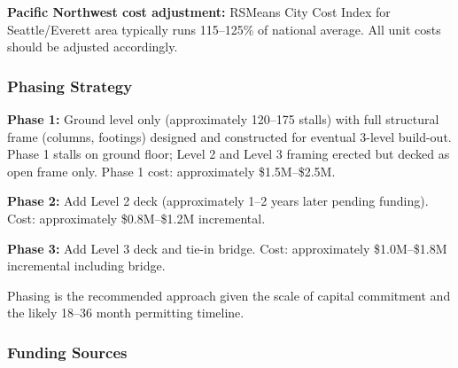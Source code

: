\documentclass[11pt,letterpaper]{article}
\begin{document}
\textbf{Pacific Northwest cost adjustment:} RSMeans City Cost Index for Seattle/Everett area typically runs 115--125\% of national average. All unit costs should be adjusted accordingly.

\subsubsection{Phasing Strategy}

\textbf{Phase 1:} Ground level only (approximately 120--175 stalls) with full structural frame (columns, footings) designed and constructed for eventual 3-level build-out. Phase 1 stalls on ground floor; Level 2 and Level 3 framing erected but decked as open frame only. Phase 1 cost: approximately \$1.5M--\$2.5M.

\textbf{Phase 2:} Add Level 2 deck (approximately 1--2 years later pending funding). Cost: approximately \$0.8M--\$1.2M incremental.

\textbf{Phase 3:} Add Level 3 deck and tie-in bridge. Cost: approximately \$1.0M--\$1.8M incremental including bridge.

Phasing is the recommended approach given the scale of capital commitment and the likely 18--36 month permitting timeline.

\subsubsection{Funding Sources}
\end{document}
